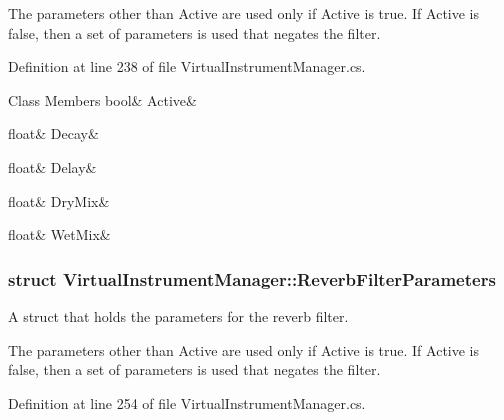 The parameters other than Active are used only if Active is true. If Active is false, then a set of parameters is used that negates the filter. 

Definition at line 238 of file Virtual\+Instrument\+Manager.\+cs.

\begin{DoxyFields}{Class Members}
\mbox{\label{group__filter_params_adbed98a4cc0e2688edabbadfba58a18b}} 
bool&
Active&
\\
\hline

\mbox{\label{group__filter_params_a7e529eb3e4de120daabef80608dcde27}} 
float&
Decay&
\\
\hline

\mbox{\label{group__filter_params_a2594ca005d747a272e4aa411bef21f6e}} 
float&
Delay&
\\
\hline

\mbox{\label{group__filter_params_ab192892df9a03c86b8ce93be434f75be}} 
float&
DryMix&
\\
\hline

\mbox{\label{group__filter_params_a654d4a14431e8c8758f3f58a97d1e61f}} 
float&
WetMix&
\\
\hline

\end{DoxyFields}
\label{struct_virtual_instrument_manager_1_1_reverb_filter_parameters}
\subsubsection{struct Virtual\+Instrument\+Manager\+:\+:Reverb\+Filter\+Parameters}
A struct that holds the parameters for the reverb filter. 

The parameters other than Active are used only if Active is true. If Active is false, then a set of parameters is used that negates the filter. 

Definition at line 254 of file Virtual\+Instrument\+Manager.\+cs.

